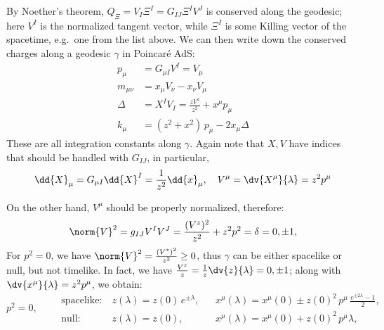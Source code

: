 \documentclass[a4paper,10pt]{article}
\begin{document}
	By Noether's theorem, $Q_\Xi = V_I \Xi^I = G_{IJ} \Xi^I V^J$ is conserved along the geodesic; here $V^I$ is the normalized tangent vector, while $\Xi^I$ is some Killing vector of the spacetime, e.g.~one from the list above. 
	We can then write down the conserved charges along a geodesic $\gamma$ in Poincar\'e AdS:
	\begin{equation}
	\begin{aligned}
		p_\mu
			&= G_{\mu I} V^I = V_\mu \\
		m_{\mu\nu}
			&= x_\mu V_\nu - x_\nu V_\mu \\
		\Delta
			&= X^I V_I
			= \frac{z V^z}{z^2} + x^\mu p_\mu
		\\
		k_\mu &= (z^2 + x^2)\, p_\mu - 2x_\mu \Delta
	\end{aligned}
	\end{equation}
	These are all integration constants along $\gamma$. 
	Again note that $X,V$ have indices that should be handled with $G_{IJ}$, in particular,
	\begin{equation}
		\dd{X}_\mu
		= G_{\mu I} \dd{X}^I
		= \frac{1}{z^2} \dd{x}_\mu,
	\quad
		V^\mu = \dv{X^\mu}{\lambda} = z^2 p^\mu
	\label{eq:p_conserved}
	\end{equation}
	
	On the other hand, $V^\mu$ should be properly normalized, therefore:
	\begin{equation}
	\begin{gathered}
		\norm{V}^2
		= g_{IJ} V^I V^J
		= \frac{(V^z)^2}{z^2} + z^2 p^2
		= \delta = 0,\pm 1,
	\label{eq:tangent_norm}
	\end{gathered}
	\end{equation}
	For $p^2 = 0$, we have $
		\norm{V}^2
		= \frac{(V^z)^2}{z^2}
		\ge 0
	$, thus $\gamma$ can be either spacelike or null, but not timelike. In fact, we have $
		\frac{V^z}{z}
		= \frac{1}{z}\dv{z}{\lambda}
		= 0,\pm 1
	$; along with $\dv{x^\mu}{\lambda} = z^2 p^\mu$, we obtain:
	\begin{equation}
	p^2 = 0,\qquad
	\begin{aligned}
		\text{spacelike}\colon\ &
			z(\lambda)
			= z(0)\,e^{\pm\lambda},
		&&
			x^\mu(\lambda)
			= x^\mu(0) \pm z(0)^2\,p^\mu\,
				\tfrac{
					e^{\pm 2\lambda} - 1
				}{2}, \\
		\text{null}\colon\ &
			z(\lambda)
			= z(0),
		&&
			x^\mu(\lambda)
			= x^\mu(0) + z(0)^2\,p^\mu \lambda,
	\end{aligned}
	\label{eq:null_type}
	\end{equation}
	
\end{document}

